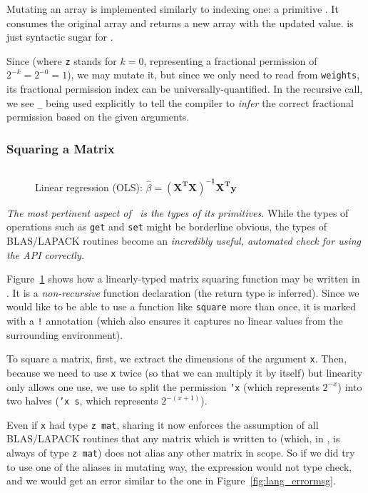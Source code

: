 Mutating an array is implemented similarly to indexing one: a primitive
.  It consumes the original
array and returns a new array with the updated value.   is just syntactic sugar for .

Since  (where \texttt{z} stands for $k=0$, representing a
fractional permission of $2^{-k} = 2^{-0} = 1$), we may mutate it, but since we
only need to read from \texttt{weights}, its fractional permission index can be
universally-quantified. In the recursive call, we see \texttt{\_} being used
explicitly to tell the compiler to \emph{infer} the correct fractional
permission based on the given arguments.

\subsubsection{Squaring a Matrix}

\begin{figure}[t]
    \centering
    \inputminted[fontsize=\small]{ocaml}{../../examples/square.lt}
    \caption{Linear regression (OLS): $\hat\beta =
        \mathbf{(X^T X)^{-1} X^T y}$}\label{fig:lang_square}
\end{figure}

\emph{The most pertinent aspect of \lang\ is the types of its primitives.}
While the types of operations such as \texttt{get} and \texttt{set} might be
borderline obvious, the types of BLAS/LAPACK routines become an
\emph{incredibly useful, automated check for using the API correctly.}

Figure~\ref{fig:lang_square} shows how a linearly-typed matrix squaring
function may be written in \lang. It is a \emph{non-recursive} function
declaration (the return type is inferred). Since we would like to be able to
use a function like \texttt{square} more than once, it is marked with a
\texttt{!} annotation (which also ensures it captures no linear values from the
surrounding environment).

To square a matrix, first, we extract the dimensions of the argument
\texttt{x}. Then, because we need to use \texttt{x} twice (so that we can
multiply it by itself) but linearity only allows one use, we use  to split the permission \texttt{'x} (which
represents $2^{-x}$) into two halves (\texttt{'x s}, which represents $2^{-(x+1)}$).

Even if \texttt{x} had type \texttt{z mat}, sharing it now enforces the
assumption of all BLAS/LAPACK routines that any matrix which is written to
(which, in \lang, is always of type \texttt{z mat}) does not alias any other
matrix in scope. So if we did try to use one of the aliases in mutating way,
the expression would not type check, and we would get an error similar to the
one in Figure~\ref{fig:lang_errormsg}.

